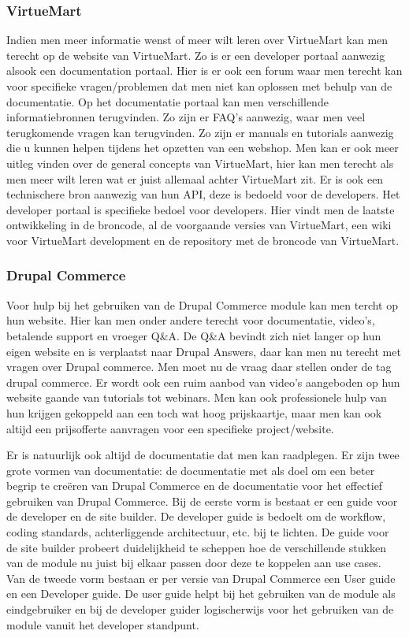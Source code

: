 \subsubsection{VirtueMart}
Indien men meer informatie wenst of meer wilt leren over VirtueMart kan men terecht op de website van VirtueMart. Zo is er een developer portaal aanwezig alsook een documentation portaal. Hier is er ook een forum waar men terecht kan voor specifieke vragen/problemen dat men niet kan oplossen met behulp van de documentatie. Op het documentatie portaal kan men verschillende informatiebronnen terugvinden. Zo zijn er FAQ's aanwezig, waar men veel terugkomende vragen kan terugvinden. Zo zijn er manuals en tutorials aanwezig die u kunnen helpen tijdens het opzetten van een webshop. Men kan er ook meer uitleg vinden over de general concepts van VirtueMart, hier kan men terecht als men meer wilt leren wat er juist allemaal achter VirtueMart zit. Er is ook een technischere bron aanwezig van hun API, deze is bedoeld voor de developers. Het developer portaal is specifieke bedoel voor developers. Hier vindt men de laatste ontwikkeling in de broncode, al de voorgaande versies van VirtueMart, een wiki voor VirtueMart development en de repository met de broncode van VirtueMart.
\subsubsection{Drupal Commerce}
Voor hulp bij het gebruiken van de Drupal Commerce module kan men tercht op hun website. Hier kan men onder andere terecht voor documentatie, video's, betalende support en vroeger Q\&A. De Q\&A bevindt zich niet langer op hun eigen website en is verplaatst naar Drupal Answers, daar kan men nu terecht met vragen over Drupal commerce. Men moet nu de vraag daar stellen onder de tag drupal commerce. Er wordt ook een ruim aanbod van video's aangeboden op hun website gaande van tutorials tot webinars. Men kan ook professionele hulp van hun krijgen gekoppeld aan een toch wat hoog prijskaartje, maar men kan ook altijd een prijsofferte aanvragen voor een specifieke project/website.

Er is natuurlijk ook altijd de documentatie dat men kan raadplegen. Er zijn twee grote vormen van documentatie: de documentatie met als doel om een beter begrip te creëren van Drupal Commerce en de documentatie voor het effectief gebruiken van Drupal Commerce. Bij de eerste vorm is bestaat er een guide voor de developer en de site builder. De developer guide is bedoelt om de workflow, coding standards, achterliggende architectuur, etc. bij te lichten. De guide voor de site builder probeert duidelijkheid te scheppen hoe de verschillende stukken van de module nu juist bij elkaar passen door deze te koppelen aan use cases. Van de tweede vorm bestaan er per versie van Drupal Commerce een User guide en een Developer guide. De user guide helpt bij het gebruiken van de module als eindgebruiker en bij de developer guider logischerwijs voor het gebruiken van de module vanuit het developer standpunt.
